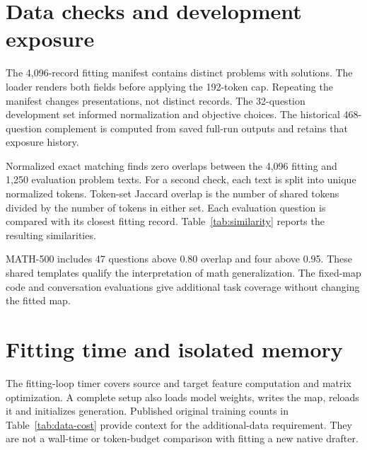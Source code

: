 \documentclass{article}
\begin{document}
\section{Data checks and development exposure}
\label{app:data}

The 4,096-record fitting manifest contains distinct problems with solutions.
The loader renders both fields before applying the 192-token cap.
Repeating the manifest changes presentations, not distinct records.
The 32-question development set informed normalization and objective
choices. The historical 468-question complement is computed from saved
full-run outputs and retains that exposure history.

Normalized exact matching finds zero overlaps between the 4,096 fitting
and 1,250 evaluation problem texts. For a second check, each text is split
into unique normalized tokens. Token-set Jaccard overlap is the number of
shared tokens divided by the number of tokens in either set. Each
evaluation question is compared with its closest fitting record.
Table~\ref{tab:similarity} reports the resulting similarities.

\begin{table}[H]
\caption{Closest fitting-to-evaluation token-set overlap. Threshold
columns count evaluation records at or above the stated overlap.}
\label{tab:similarity}
\centering\small

\end{table}

MATH-500 includes 47 questions above 0.80 overlap and four above 0.95.
These shared templates qualify the interpretation of math generalization.
The fixed-map code and conversation evaluations give additional task
coverage without changing the fitted map.

\section{Fitting time and isolated memory}
\label{app:cost}

\begin{table}[H]
\caption{Selected map size and warm fitting-loop duration on four RTX
6000 Ada GPUs. Models are loaded before the recorded loop begins.}
\label{tab:resource}
\centering\small

\end{table}

The fitting-loop timer covers source and target feature computation and
matrix optimization. A complete setup also loads model weights, writes
the map, reloads it and initializes generation. Published original
training counts in Table~\ref{tab:data-cost} provide context for the
additional-data requirement. They are not a wall-time or token-budget
comparison with fitting a new native drafter.
\end{document}
